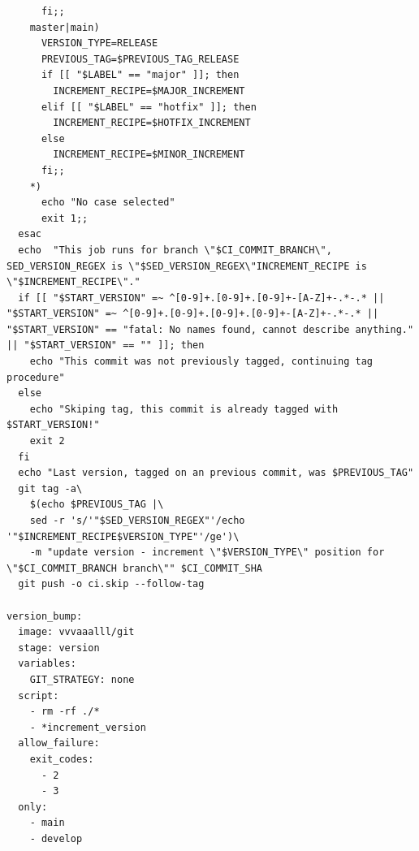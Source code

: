 \documentclass[a4paper,12pt,oneside]{article}
\begin{document}
\begin{lstlisting}
      fi;;
    master|main)
      VERSION_TYPE=RELEASE
      PREVIOUS_TAG=$PREVIOUS_TAG_RELEASE
      if [[ "$LABEL" == "major" ]]; then
        INCREMENT_RECIPE=$MAJOR_INCREMENT
      elif [[ "$LABEL" == "hotfix" ]]; then
        INCREMENT_RECIPE=$HOTFIX_INCREMENT
      else
        INCREMENT_RECIPE=$MINOR_INCREMENT
      fi;;
    *)
      echo "No case selected"
      exit 1;;
  esac
  echo  "This job runs for branch \"$CI_COMMIT_BRANCH\", SED_VERSION_REGEX is \"$SED_VERSION_REGEX\"INCREMENT_RECIPE is \"$INCREMENT_RECIPE\"."
  if [[ "$START_VERSION" =~ ^[0-9]+.[0-9]+.[0-9]+-[A-Z]+-.*-.* || "$START_VERSION" =~ ^[0-9]+.[0-9]+.[0-9]+.[0-9]+-[A-Z]+-.*-.* || "$START_VERSION" == "fatal: No names found, cannot describe anything." || "$START_VERSION" == "" ]]; then
    echo "This commit was not previously tagged, continuing tag procedure"
  else
    echo "Skiping tag, this commit is already tagged with $START_VERSION!"
    exit 2
  fi
  echo "Last version, tagged on an previous commit, was $PREVIOUS_TAG"
  git tag -a\
    $(echo $PREVIOUS_TAG |\
    sed -r 's/'"$SED_VERSION_REGEX"'/echo '"$INCREMENT_RECIPE$VERSION_TYPE"'/ge')\
    -m "update version - increment \"$VERSION_TYPE\" position for \"$CI_COMMIT_BRANCH branch\"" $CI_COMMIT_SHA
  git push -o ci.skip --follow-tag

version_bump:
  image: vvvaaalll/git
  stage: version
  variables:
    GIT_STRATEGY: none
  script:
    - rm -rf ./*
    - *increment_version
  allow_failure:
    exit_codes:
      - 2
      - 3
  only:
    - main
    - develop

\end{lstlisting}
\end{document}
